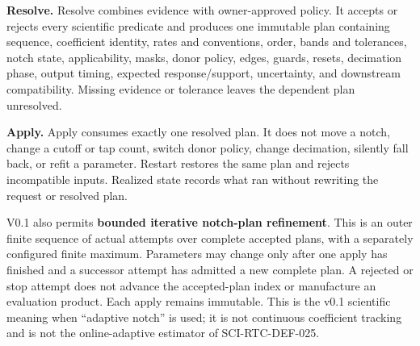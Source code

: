 \documentclass[10pt]{article}
\begin{document}
\textbf{Resolve.} Resolve combines evidence with owner-approved policy. It
accepts or rejects every scientific predicate and produces one immutable plan
containing sequence, coefficient identity, rates and conventions, order,
bands and tolerances, notch state, applicability, masks, donor policy, edges,
guards, resets, decimation phase, output timing, expected response/support,
uncertainty, and downstream compatibility. Missing evidence or tolerance
leaves the dependent plan unresolved.

\textbf{Apply.} Apply consumes exactly one resolved plan. It does not move a
notch, change a cutoff or tap count, switch donor policy, change decimation,
silently fall back, or refit a parameter. Restart restores the same plan and
rejects incompatible inputs. Realized state records what ran without rewriting
the request or resolved plan.

V0.1 also permits \textbf{bounded iterative notch-plan refinement}.  This is
an outer finite sequence of actual attempts over complete accepted plans,
with a separately configured finite maximum. Parameters
may change only after one apply has finished and a successor attempt has
admitted a new complete plan. A rejected or stop attempt does not advance the
accepted-plan index or manufacture an evaluation product. Each apply remains immutable. This is the
v0.1 scientific meaning when ``adaptive notch'' is used; it is not continuous
coefficient tracking and is not the online-adaptive estimator of
SCI-RTC-DEF-025.

\begin{center}
\end{center}
\end{document}
